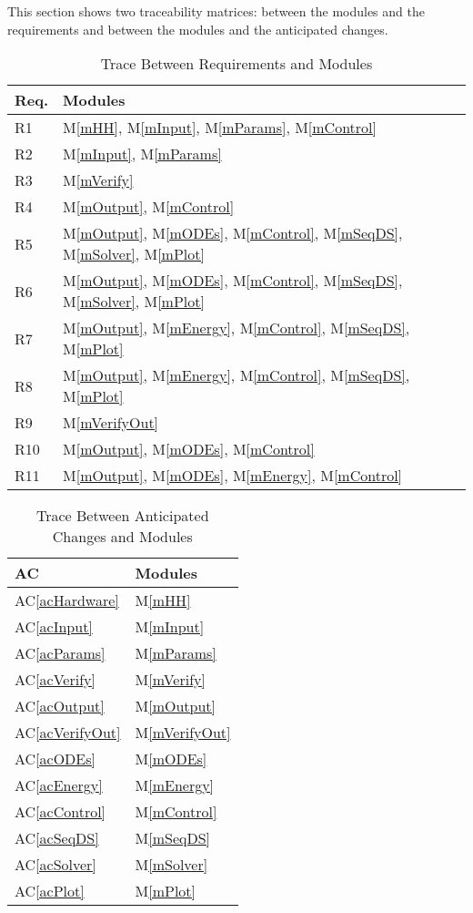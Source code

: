 \documentclass[12pt, titlepage]{article}
\newcommand{\acref}[1]{AC\ref{#1}}
\newcommand{\mref}[1]{M\ref{#1}}
\begin{document}
This section shows two traceability matrices: between the modules and the
requirements and between the modules and the anticipated changes.

\begin{table}[H]
\centering
\begin{tabular}{p{} p{}}
\toprule
\textbf{Req.} & \textbf{Modules}\\
\midrule
R1 & \mref{mHH}, \mref{mInput}, \mref{mParams}, \mref{mControl}\\
R2 & \mref{mInput}, \mref{mParams}\\
R3 & \mref{mVerify}\\
R4 & \mref{mOutput}, \mref{mControl}\\
R5 & \mref{mOutput}, \mref{mODEs}, \mref{mControl}, \mref{mSeqDS},
\mref{mSolver}, \mref{mPlot}\\
R6 & \mref{mOutput}, \mref{mODEs}, \mref{mControl}, \mref{mSeqDS},
\mref{mSolver}, \mref{mPlot}\\
R7 & \mref{mOutput}, \mref{mEnergy}, \mref{mControl}, \mref{mSeqDS},
\mref{mPlot}\\
R8 & \mref{mOutput}, \mref{mEnergy}, \mref{mControl}, \mref{mSeqDS},
\mref{mPlot}\\
R9 & \mref{mVerifyOut}\\
R10 & \mref{mOutput}, \mref{mODEs}, \mref{mControl}\\
R11 & \mref{mOutput}, \mref{mODEs}, \mref{mEnergy}, \mref{mControl}\\
\bottomrule
\end{tabular}
\caption{Trace Between Requirements and Modules}
\label{TblRT}
\end{table}

\begin{table}[H]
\centering
\begin{tabular}{p{} p{}}
\toprule
\textbf{AC} & \textbf{Modules}\\
\midrule
\acref{acHardware} & \mref{mHH}\\
\acref{acInput} & \mref{mInput}\\
\acref{acParams} & \mref{mParams}\\
\acref{acVerify} & \mref{mVerify}\\
\acref{acOutput} & \mref{mOutput}\\
\acref{acVerifyOut} & \mref{mVerifyOut}\\
\acref{acODEs} & \mref{mODEs}\\
\acref{acEnergy} & \mref{mEnergy}\\
\acref{acControl} & \mref{mControl}\\
\acref{acSeqDS} & \mref{mSeqDS}\\
\acref{acSolver} & \mref{mSolver}\\
\acref{acPlot} & \mref{mPlot}\\
\bottomrule
\end{tabular}
\caption{Trace Between Anticipated Changes and Modules}
\label{TblACT}
\end{table}
\end{document}
